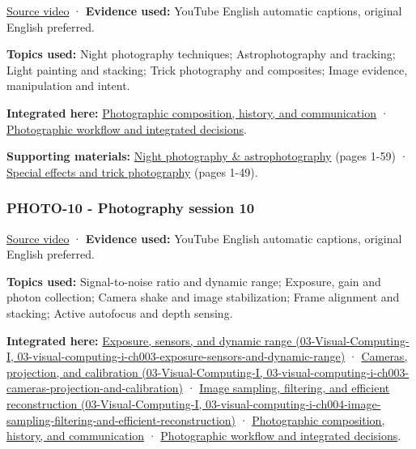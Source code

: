 \href{https://www.youtube.com/watch?v=1ah8EEqfFsM}{Source video} · \textbf{Evidence used:} YouTube English automatic captions, original English preferred.

\textbf{Topics used:} Night photography techniques; Astrophotography and tracking; Light painting and stacking; Trick photography and composites; Image evidence, manipulation and intent.

\textbf{Integrated here:} \hyperref[04-visual-computing-ii-ch034-photographic-composition-history-and-communication]{Photographic composition, history, and communication} · \hyperref[04-visual-computing-ii-ch034-photographic-workflow-and-integrated-decisions]{Photographic workflow and integrated decisions}.

\textbf{Supporting materials:} \href{https://drive.google.com/open?id=0B6w2XfPHEcZYaTJ5M2RhZzBwWTg}{Night photography \& astrophotography} (pages 1-59) · \href{https://drive.google.com/open?id=0B6w2XfPHEcZYdklBY3BfVTFSSnM}{Special effects and trick photography} (pages 1-49).

\subsubsection{PHOTO-10 - Photography session 10}\label{04-visual-computing-ii-ch036-photo-10---photography-session-10}

\href{https://www.youtube.com/watch?v=ia9w4ZtdULs}{Source video} · \textbf{Evidence used:} YouTube English automatic captions, original English preferred.

\textbf{Topics used:} Signal-to-noise ratio and dynamic range; Exposure, gain and photon collection; Camera shake and image stabilization; Frame alignment and stacking; Active autofocus and depth sensing.

\textbf{Integrated here:} \href{../03-Visual-Computing-I/main.pdf\#nameddest=03-visual-computing-i-ch003-exposure-sensors-and-dynamic-range}{Exposure, sensors, and dynamic range (03-Visual-Computing-I, 03-visual-computing-i-ch003-exposure-sensors-and-dynamic-range)} · \href{../03-Visual-Computing-I/main.pdf\#nameddest=03-visual-computing-i-ch003-cameras-projection-and-calibration}{Cameras, projection, and calibration (03-Visual-Computing-I, 03-visual-computing-i-ch003-cameras-projection-and-calibration)} · \href{../03-Visual-Computing-I/main.pdf\#nameddest=03-visual-computing-i-ch004-image-sampling-filtering-and-efficient-reconstruction}{Image sampling, filtering, and efficient reconstruction (03-Visual-Computing-I, 03-visual-computing-i-ch004-image-sampling-filtering-and-efficient-reconstruction)} · \hyperref[04-visual-computing-ii-ch034-photographic-composition-history-and-communication]{Photographic composition, history, and communication} · \hyperref[04-visual-computing-ii-ch034-photographic-workflow-and-integrated-decisions]{Photographic workflow and integrated decisions}.

